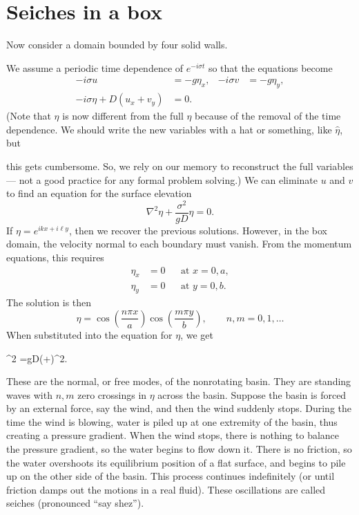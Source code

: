 \section{Seiches in a box}

Now consider a domain bounded by four solid walls.


\wavefiguremark

We assume a periodic time dependence of $e^{-i\sigma t}$ so that the equations become
\begin{align*}
	-i\sigma u              & =-g\eta_x,
	                        & -i\sigma v & =-g\eta_y, \\
	-i\sigma\eta+D(u_x+v_y) & =0.
\end{align*}
(Note that $\eta$ is now different from the full $\eta$ because of the removal of the
time dependence. We should write the new variables with a hat or something, like
$\hat{\eta}$, but

\sourcepagebreak

this gets cumbersome. So, we rely on our memory to reconstruct the full variables---
not a good practice for any formal problem solving.) We can eliminate $u$ and $v$ to
find an equation for the surface elevation
\[
	\nabla^2\eta+\frac{\sigma^2}{gD}\eta=0.
\]
If $\eta=e^{ikx+i\ell y}$, then we recover the previous solutions. However, in the box
domain, the velocity normal to each boundary must vanish. From the momentum
equations, this requires
\begin{align*}
	\eta_x & =0 &  & \text{at }x=0,a, \\
	\eta_y & =0 &  & \text{at }y=0,b.
\end{align*}
The solution is then
\[
	\eta
	=\cos\left(\frac{n\pi x}{a}\right)
	\cos\left(\frac{m\pi y}{b}\right),
	\qquad n,m=0,1,\ldots
\]
When substituted into the equation for $\eta$, we get
\begin{waveequation}
	\sigma^2
	=gD\left(+\right)\pi^2.
\end{waveequation}

These are the normal, or free modes, of the nonrotating basin. They are standing waves
with $n,m$ zero crossings in $\eta$ across the basin. Suppose the basin is forced by an
external force, say the wind, and then the wind suddenly stops. During the time the
wind is blowing, water is piled up at one extremity of the basin, thus creating a
pressure gradient. When the wind stops, there is nothing to balance the pressure
gradient, so the water begins to flow down it. There is no friction, so the water
overshoots its equilibrium position of a flat surface, and begins to pile up on the other
side of the basin. This process continues indefinitely (or until friction damps out the
motions in a real fluid). These oscillations are called seiches (pronounced ``say shez'').

